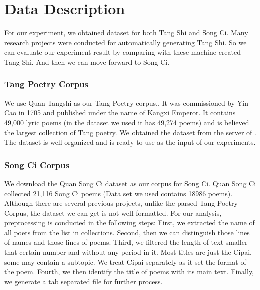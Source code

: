 \section{Data Description}   
For our experiment, we obtained dataset for both Tang Shi and Song Ci. Many research projects were conducted for automatically generating Tang Shi. So we can evaluate our experiment result by comparing with these machine-created Tang Shi. And then we can move forward to Song Ci.
\subsubsection{Tang Poetry Corpus}
We use Quan Tangshi as our Tang Poetry corpus.\cite{1960quantangshi}. It was commissioned by Yin Cao in 1705 and published under the name of Kangxi Emperor. It contains 49,000 lyric poems (in the dataset we used it has 49,274 poems) and is believed the largest collection of Tang poetry. We obtained the dataset from the server of \cite{zhang2014chinese}. The dataset is well organized and is ready to use as the input of our experiments.
\subsubsection{Song Ci Corpus}
We download the Quan Song Ci dataset as our corpus for Song Ci. Quan Song Ci collected 21,116 Song Ci poems (Data set we used contains 18986 poems). Although there are several previous projects, unlike the parsed Tang Poetry Corpus, the dataset we can get is not well-formatted. For our analysis, preprocessing is conducted in the following steps: First, we extracted the name of all poets from the list in collections. Second, then we can distinguish those lines of names and those lines of poems. Third, we filtered the length of text smaller that certain number and without any period in it. Most titles are just the Cipai, some may contain a subtopic. We treat Cipai separately as it set the format of the poem. Fourth, we then identify the title of poems with its main text. Finally, we generate a tab separated file for further process.